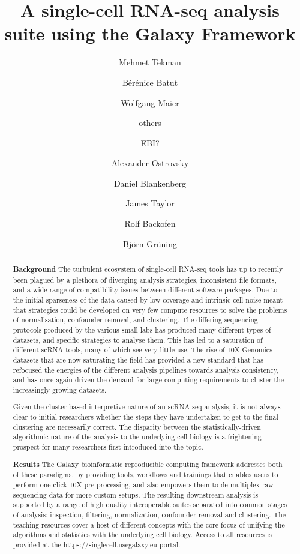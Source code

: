 \documentclass[a4paper,num-refs]{oup-contemporary}
\title{A single-cell RNA-seq analysis suite using the Galaxy Framework}
\author[1,\authfn{1},\authfn{2}]{Mehmet Tekman}
\author[2,\authfn{1},\authfn{2}]{Bérénice Batut}
\author[2,\authfn{1},\authfn{2}]{Wolfgang Maier}
\author[2]{others}
\author[2]{EBI?}
\author[2,\authfn{1},\authfn{2}]{Alexander Ostrovsky}
\author[2,\authfn{1},\authfn{2}]{Daniel Blankenberg}
\author[2,\authfn{1},\authfn{2}]{James Taylor}
\author[1,\authfn{1}]{Rolf Backofen}
\author[1,\authfn{1}]{Björn Grüning}
\affil[1]{Chair of Bioinformatics, University of Freiburg, Freiburg, Germany, }
\affil[2]{Second Institution}
\begin{document}
\begin{frontmatter}
\maketitle
\begin{abstract}
\textbf{Background} The turbulent ecosystem of single-cell RNA-seq tools has up to recently been plagued by a plethora of diverging analysis strategies, inconsistent file formats, and a wide range of compatibility issues between different software packages. Due to the initial sparseness of the data caused by low coverage and intrinsic cell noise meant that strategies could be developed on very few compute resources to solve the problems of normalisation, confounder removal, and clustering. The differing sequencing protocols produced by the various small labs has produced many different types of datasets, and specific strategies to analyse them. This has led to a saturation of different scRNA tools, many of which see very little use. The rise of 10X Genomics datasets that are now saturating the field has provided a new standard that has refocused the energies of the different analysis pipelines towards analysis consistency, and has once again driven the demand for large computing requirements to cluster the increasingly growing datasets.

Given the cluster-based interpretive nature of an scRNA-seq analysis, it is not always clear to initial researchers whether the steps they have undertaken to get to the final clustering are necessarily correct. The disparity between the statistically-driven algorithmic nature of the analysis to the underlying cell biology is a frightening prospect for many researchers first introduced into the topic.

\textbf{Results}
The Galaxy bioinformatic reproducible computing framework addresses both of these paradigms, by providing tools, workflows and trainings that enables users to perform one-click 10X pre-processing, and also empowers them to de-multiplex raw sequencing data for more custom setups. The resulting downstream analysis is supported by a range of high quality interoperable suites separated into common stages of analysis: inspection, filtering, normalization, confounder removal and clustering. The teaching resources cover a host of different concepts with the core focus of unifying the algorithms and statistics with the underlying cell biology. Access to all resources is provided at the https://singlecell.usegalaxy.eu portal.


\end{abstract}
\end{frontmatter}
\end{document}
